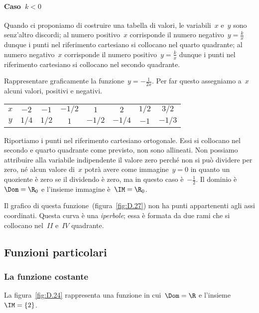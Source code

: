 \paragraph{Caso~\(k<0\)} Quando ci proponiamo di costruire una tabella di 
valori, 
le variabili~\(x\) e~\(y\) sono senz'altro discordi;
al numero positivo~\(x\) corrisponde il numero negativo~\(y=\frac{k}{x}\) 
dunque i 
punti nel riferimento cartesiano si
collocano nel quarto quadrante; al numero negativo~\(x\) corrisponde il 
numero 
positivo~\(y=\frac{k}{x}\) dunque i
punti nel riferimento cartesiano si collocano nel secondo quadrante.
 \begin{esempio}
Rappresentare graficamente la funzione~\(y=-\frac{1}{2x}\).
Per far questo assegniamo a~\(x\) alcuni valori, positivi e negativi.
\begin{center}
 \begin{tabular}{cccccccc}
 \toprule
 \(x\) & \(-2\) & \(-1\) & \(-1/2\) & \(1\) & \(2\)& \(1/2\) & \(3/2\)\\
 \(y\) & \(1/4\) & \(1/2\) & \(1\) & \(-1/2\) & \(-1/4\)& \(-1\) & \(-1/3\)\\
 \bottomrule
 \end{tabular}
\end{center}
Riportiamo i punti nel riferimento cartesiano ortogonale. Essi si collocano 
nel 
secondo e quarto quadrante come previsto,
non sono allineati. Non possiamo attribuire alla variabile indipendente il 
valore zero perché non si può dividere per zero,
né alcun valore di~\(x\) potrà avere come immagine~\(y=0\) in quanto un 
quoziente è 
zero se il dividendo è zero, ma
in questo caso è~\(-\frac{1}{2}\).
Il dominio è~\(\Dom=\R_{0}\) e l'insieme immagine è~\(\IM=\R_{0}\). 

Il grafico di questa funzione~(figura~\ref{fig:D.27}) non ha punti 
appartenenti 
agli assi coordinati.
Questa curva è una \emph{iperbole}; essa è formata da due rami che si 
collocano 
nel~\(II\) e~\(IV\) quadrante.
 \end{esempio}


\subsection{Funzioni particolari}
\label{subsec:fun_particolari}

\subsubsection{La funzione costante}
La figura~\ref{fig:D.24} rappresenta una funzione in cui~\(\Dom=\R\) e 
l'insieme~\(\IM=\{2\}\).

